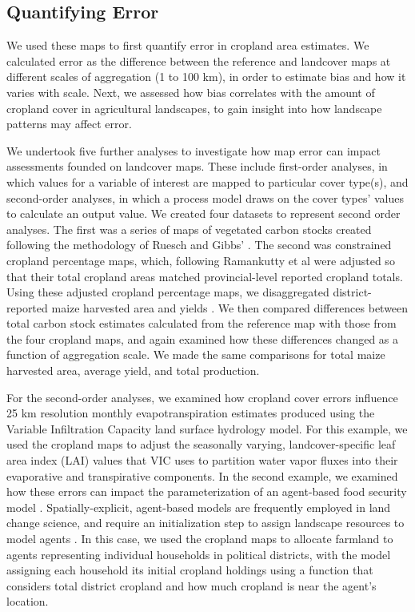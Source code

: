 \documentclass{pnastwo}
\begin{document}
\begin{article}
\vspace{-0.5 cm}
\section{Quantifying Error}
We used these maps to first quantify error in cropland area estimates. We calculated error as the difference between the reference and landcover maps at different scales of aggregation (1 to 100 km), in order to estimate bias and how it varies with scale. Next, we assessed how bias correlates with the amount of cropland cover in agricultural landscapes, to gain insight into how landscape patterns may affect error.    

We undertook five further analyses to investigate how map error can impact assessments founded on landcover maps. These include first-order analyses, in which values for a variable of interest are mapped to particular cover type(s), and second-order analyses, in which a process model draws on the cover types' values to calculate an output value. We created four datasets to represent second order analyses. The first was a series of maps of vegetated carbon stocks created following the methodology of Ruesch and Gibbs' \cite{ruesch_new_2008}. The second was constrained cropland percentage maps, which, following Ramankutty et al \cite{ramankutty_farming_2008} were adjusted so that their total cropland areas matched provincial-level reported cropland totals. Using these adjusted cropland percentage maps, we disaggregated district-reported maize harvested area and yields \cite[following][]{monfreda_farming_2008} . We then compared differences between total carbon stock estimates calculated from the reference map with those from the four cropland maps, and again examined how these differences changed as a function of aggregation scale.  We made the same comparisons for total maize harvested area, average yield, and total production. 

For the second-order analyses, we examined how cropland cover errors influence 25 km resolution monthly evapotranspiration estimates produced using the Variable Infiltration Capacity \cite{liang_simple_1994} land surface hydrology model. For this example, we used the cropland maps to adjust the seasonally varying, landcover-specific leaf area index (LAI) values that VIC uses to partition water vapor fluxes into their evaporative and transpirative components. In the second example, we examined how these errors can impact the parameterization of an agent-based food security model \cite{chen_dependency_2013}. Spatially-explicit, agent-based models are frequently employed in land change science, and require an initialization step to assign landscape resources to model agents  \cite[e.g.][]{manson_agent-based_2007,evans_multi-scale_2004,kelley_relative_2011}. In this case, we used the cropland maps to allocate farmland to agents representing individual households in political districts, with the model assigning each household its initial cropland holdings using a function that considers total district cropland and how much cropland is near the agent's location.  


\end{article}
\end{document}
